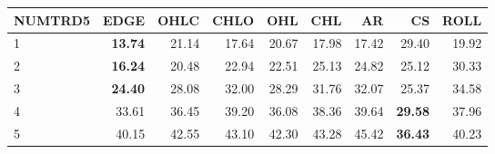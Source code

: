 \begin{table}[ht]
\centering
\begin{tabular}{lrrrrrrrr}
  \hline
NUMTRD5 & EDGE & OHLC & CHLO & OHL & CHL & AR & CS & ROLL \\ 
  \hline
1 & \textbf{13.74} & 21.14 & 17.64 & 20.67 & 17.98 & 17.42 & 29.40 & 19.92 \\ 
  2 & \textbf{16.24} & 20.48 & 22.94 & 22.51 & 25.13 & 24.82 & 25.12 & 30.33 \\ 
  3 & \textbf{24.40} & 28.08 & 32.00 & 28.29 & 31.76 & 32.07 & 25.37 & 34.58 \\ 
  4 & 33.61 & 36.45 & 39.20 & 36.08 & 38.36 & 39.64 & \textbf{29.58} & 37.96 \\ 
  5 & 40.15 & 42.55 & 43.10 & 42.30 & 43.28 & 45.42 & \textbf{36.43} & 40.23 \\ 
   \hline
\end{tabular}
\end{table}
